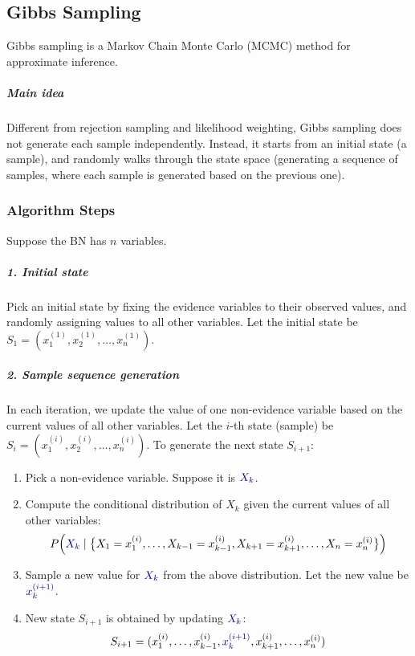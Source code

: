 \documentclass[10pt,UTF8]{article}
\theoremstyle{definition}
\newtheorem{definition inner}{Definition}[section]
\theoremstyle{definition}
\newtheorem{theorem inner}{Theorem}[section]
\theoremstyle{definition}
\newtheorem*{proof inner}{\textit{Proof}}
\theoremstyle{plain}
\newtheorem{tip inner}{Tip}[section]
\theoremstyle{remark}
\newcommand{\blue}[1]{{\color{blue!50!black}#1}} %
\begin{document}
\subsection{Gibbs Sampling}

Gibbs sampling is a Markov Chain Monte Carlo (MCMC) method for
approximate inference.

\subparagraph*{Main idea}
Different from rejection sampling and likelihood weighting,
Gibbs sampling does not generate each sample independently.
Instead, it starts from an initial state (a sample),
and randomly walks through the state space
(generating a sequence of samples, where each sample is generated
based on the previous one).

\subsubsection{Algorithm Steps}

Suppose the BN has \(n\) variables.

\subparagraph*{1. Initial state}
Pick an initial state by fixing the evidence variables
to their observed values,
and randomly assigning values to all other variables.
Let the initial state be
\(S_1 = (x_1^{(1)}, x_2^{(1)}, \ldots, x_n^{(1)})\).

\subparagraph*{2. Sample sequence generation}
In each iteration, we update the value of one non-evidence variable
based on the current values of all other variables.
Let the \(i\)-th state (sample) be
\(S_i = (x_1^{(i)}, x_2^{(i)}, \ldots, x_n^{(i)})\).
To generate the next state \(S_{i+1}\):

\begin{enumerate}
  \item Pick a non-evidence variable. Suppose it is \(\blue{X_k}\).
  \item Compute the conditional distribution of \(X_k\)
    given the current values of all other variables:
    \[
      P\Big(\blue{X_k} \mid
        \big \{ X_1 = x_1^{(i)}, \ldots, X_{k-1} = x_{k-1}^{(i)},
      X_{k+1} = x_{k+1}^{(i)}, \ldots, X_n = x_n^{(i)} \big \} \Big)
    \]
  \item Sample a new value for \(\blue{X_k}\) from the above distribution.
    Let the new value be \(\blue{x_k^{(i+1)}}\).
  \item New state \(S_{i+1}\) is obtained by updating \(\blue{X_k}\):
    \[
      S_{i+1} = (x_1^{(i)}, \ldots, x_{k-1}^{(i)},
      \blue{x_k^{(i+1)}}, x_{k+1}^{(i)}, \ldots, x_n^{(i)})
    \]
\end{enumerate}
\end{document}
